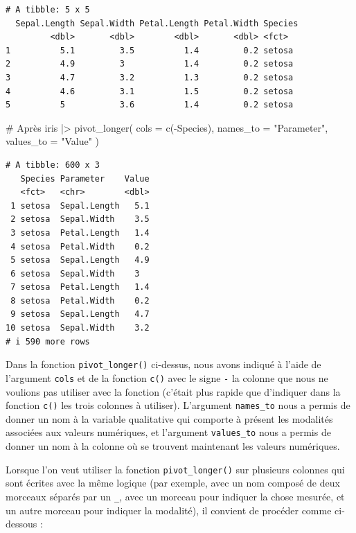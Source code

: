 \documentclass[
  letterpaper,
]{book}
\newenvironment{Shaded}{\begin{snugshade}}{\end{snugshade}}
\newcommand{\AttributeTok}[1]{\textcolor[rgb]{0.40,0.45,0.13}{#1}}
\newcommand{\CommentTok}[1]{\textcolor[rgb]{0.37,0.37,0.37}{#1}}
\newcommand{\FunctionTok}[1]{\textcolor[rgb]{0.28,0.35,0.67}{#1}}
\newcommand{\NormalTok}[1]{\textcolor[rgb]{0.00,0.23,0.31}{#1}}
\newcommand{\SpecialCharTok}[1]{\textcolor[rgb]{0.37,0.37,0.37}{#1}}
\newcommand{\StringTok}[1]{\textcolor[rgb]{0.13,0.47,0.30}{#1}}
\begin{document}
\begin{verbatim}
# A tibble: 5 x 5
  Sepal.Length Sepal.Width Petal.Length Petal.Width Species
         <dbl>       <dbl>        <dbl>       <dbl> <fct>  
1          5.1         3.5          1.4         0.2 setosa 
2          4.9         3            1.4         0.2 setosa 
3          4.7         3.2          1.3         0.2 setosa 
4          4.6         3.1          1.5         0.2 setosa 
5          5           3.6          1.4         0.2 setosa 
\end{verbatim}

\begin{Shaded}
\begin{Highlighting}[]
\CommentTok{\# Après}
\NormalTok{iris }\SpecialCharTok{|\textgreater{}} 
  \FunctionTok{pivot\_longer}\NormalTok{(}
    \AttributeTok{cols =} \FunctionTok{c}\NormalTok{(}\SpecialCharTok{{-}}\NormalTok{Species),}
    \AttributeTok{names\_to =} \StringTok{"Parameter"}\NormalTok{,}
    \AttributeTok{values\_to =} \StringTok{"Value"}
\NormalTok{    )}
\end{Highlighting}
\end{Shaded}

\begin{verbatim}
# A tibble: 600 x 3
   Species Parameter    Value
   <fct>   <chr>        <dbl>
 1 setosa  Sepal.Length   5.1
 2 setosa  Sepal.Width    3.5
 3 setosa  Petal.Length   1.4
 4 setosa  Petal.Width    0.2
 5 setosa  Sepal.Length   4.9
 6 setosa  Sepal.Width    3  
 7 setosa  Petal.Length   1.4
 8 setosa  Petal.Width    0.2
 9 setosa  Sepal.Length   4.7
10 setosa  Sepal.Width    3.2
# i 590 more rows
\end{verbatim}

Dans la fonction \texttt{pivot\_longer()} ci-dessus, nous avons indiqué
à l'aide de l'argument \texttt{cols} et de la fonction \texttt{c()} avec
le signe \texttt{-} la colonne que nous ne voulions pas utiliser avec la
fonction (c'était plus rapide que d'indiquer dans la fonction
\texttt{c()} les trois colonnes à utiliser). L'argument
\texttt{names\_to} nous a permis de donner un nom à la variable
qualitative qui comporte à présent les modalités associées aux valeurs
numériques, et l'argument \texttt{values\_to} nous a permis de donner un
nom à la colonne où se trouvent maintenant les valeurs numériques.

Lorsque l'on veut utiliser la fonction \texttt{pivot\_longer()} sur
plusieurs colonnes qui sont écrites avec la même logique (par exemple,
avec un nom composé de deux morceaux séparés par un \texttt{\_}, avec un
morceau pour indiquer la chose mesurée, et un autre morceau pour
indiquer la modalité), il convient de procéder comme ci-dessous :
\end{document}
